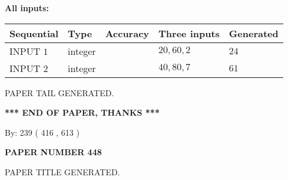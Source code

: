 \documentclass[12pt]{article}
\begin{document}
   
   
   
\noindent\vspace{0.1in}\hspace{-0.08in} {\textbf{\Large{All inputs: }}}
   
   
  
  
\noindent\begin{tabular}{|l|l|l|l|l|}
\hline
 Sequential & Type & Accuracy & Three inputs & Generated \\ 
\hline
 
 
  INPUT $  1 $ & integer &  & $
 20
 , 
 60
 , 
 2
 $ & $ 24 $ 
 \\  \hline  
 
 
  INPUT $  2 $ & integer &  & $
 40
 , 
 80
 , 
 7
 $ & $ 61 $ 
 \\  \hline  
 \end{tabular}
   
   
   
   
   
   
 \vspace{0.2in}
 
   
   
\vspace{2.0in} PAPER TAIL GENERATED.
   
   
   
   
\vspace{1.0in} 
{\textbf{\large{ *** END OF PAPER, THANKS *** }}} 
   
   
\hspace{1.0in} By: 
 239 ( 416 ,  613 )
   
   
   
   
\newpage 
\setcounter{page}{ 
   448001 } 
   
   
   
   
 {\textbf{ \Large{ PAPER NUMBER  448  }}}
   
   
\vspace{0.2in}
   
   
   
   
   
   
   
   
 \vspace{0.2in}
 
 
 
 
   
   
 PAPER TITLE GENERATED.
   
   
   
\vspace{0.2in}
   
\end{document}
